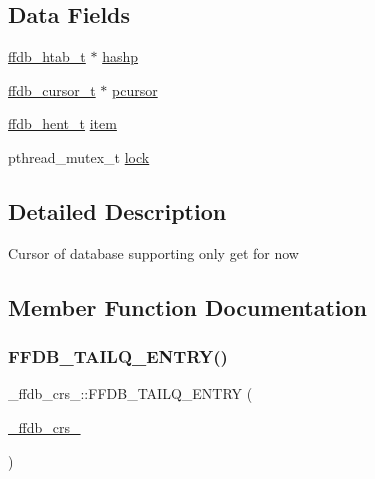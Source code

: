 \subsection*{Data Fields}
\begin{DoxyCompactItemize}
\item 
\mbox{\hyperlink{adat-devel_2other__libs_2filedb_2filehash_2ffdb__hash_8h_ae592010ed2bedc975d3cc0b7d074b9d1}{ffdb\+\_\+htab\+\_\+t}} $\ast$ \mbox{\hyperlink{struct__ffdb__crs___a527aa734d76183b95d87e2e725bdc8db}{hashp}}
\item 
\mbox{\hyperlink{adat-devel_2other__libs_2filedb_2filehash_2ffdb__db_8h_a1383f6fb3966b0ca74206ba93b687fd9}{ffdb\+\_\+cursor\+\_\+t}} $\ast$ \mbox{\hyperlink{struct__ffdb__crs___a65452cedb7825f994b11c3c74c3413a5}{pcursor}}
\item 
\mbox{\hyperlink{adat-devel_2other__libs_2filedb_2filehash_2ffdb__hash_8h_aa1cea5ccbd6513ed152988f7a71a936d}{ffdb\+\_\+hent\+\_\+t}} \mbox{\hyperlink{struct__ffdb__crs___afa4e8bde8a789a61d3078df069fd70d1}{item}}
\item 
pthread\+\_\+mutex\+\_\+t \mbox{\hyperlink{struct__ffdb__crs___a91ff97087fd24de639a6efce36da30e2}{lock}}
\end{DoxyCompactItemize}


\subsection{Detailed Description}
Cursor of database supporting only get for now 

\subsection{Member Function Documentation}
\mbox{\label{struct__ffdb__crs___ab69f088c55ed68ebc0cc2ed6342ef782}} 
\subsubsection{\texorpdfstring{FFDB\_TAILQ\_ENTRY()}{FFDB\_TAILQ\_ENTRY()}\hspace{0.1cm}{\footnotesize\ttfamily [1/2]}}
{\footnotesize\ttfamily \+\_\+ffdb\+\_\+crs\+\_\+\+::\+F\+F\+D\+B\+\_\+\+T\+A\+I\+L\+Q\+\_\+\+E\+N\+T\+RY (\begin{DoxyParamCaption}\item[{\mbox{\hyperlink{struct__ffdb__crs__}{\+\_\+ffdb\+\_\+crs\+\_\+}}}]{ }\end{DoxyParamCaption})}

